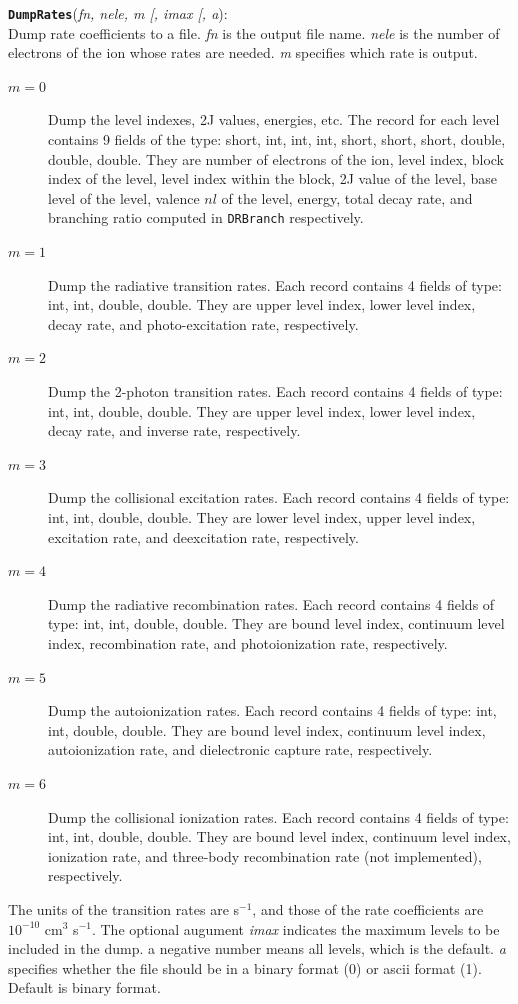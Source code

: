 \documentclass[twoside,letterpaper]{refrep}
\newcommand{\opt}[1]{
  {\textnormal{[}}{#1}\hspace{0.5mm}{\textnormal{]}}}
\newcommand{\var}[1]{\textit{#1}}
\newcommand{\key}[1]{\texttt{#1}}
\newenvironment{fundesc}[2]{
	\begin{center}
	\begin{minipage}{\textwidth}
	\index{#1}
	\addcontentsline{toc}{subsubsection}{#1}
	\key{\textbf{#1}}(\var{#2}):\\}
	{\end{minipage}\end{center}}
\begin{document}
\begin{fundesc}{DumpRates}{fn, nele, m\opt{, imax\opt{, a}}}
Dump rate coefficients to a file. \var{fn} is the output file name. \var{nele}
is the number of electrons of the ion whose rates are needed. \var{m}
specifies which rate is output.
\begin{description}
\item[$m=0$]
Dump the level indexes, 2J values, energies, etc. 
The record for each level contains 9 fields of the type: short, int, int,
int, short, short, short, double, double, double. They are number of electrons
of the ion, level index, block index of the level, level index within the
block, 2J value of the level, base level of the level, valence $nl$ of the
level, energy, total decay rate, and branching ratio computed in \key{DRBranch}
respectively. 
\item[$m=1$]
Dump the radiative transition rates. Each record contains 4 fields of type:
int, int, double, double. They are upper level index, lower level index, decay
rate, and photo-excitation rate, respectively.
\item[$m=2$]
Dump the 2-photon transition rates. Each record contains 4 fields of type:
int, int, double, double. They are upper level index, lower level index, decay
rate, and inverse rate, respectively.
\item[$m=3$]
Dump the collisional excitation rates. Each record contains 4 fields of type:
int, int, double, double. They are lower level index, upper level index, excitation
rate, and deexcitation rate, respectively.
\item[$m=4$]
Dump the radiative recombination rates. Each record contains 4 fields of type:
int, int, double, double. They are bound level index, continuum level index,
recombination rate, and photoionization rate, respectively.
\item[$m=5$]
Dump the autoionization rates. Each record contains 4 fields of type:
int, int, double, double. They are bound level index, continuum level index,
autoionization rate, and dielectronic capture rate, respectively.
\item[$m=6$]
Dump the collisional ionization rates. Each record contains 4 fields of type:
int, int, double, double. They are bound level index, continuum level index,
ionization rate, and three-body recombination rate (not implemented), respectively.
\end{description}
The units of the transition rates are s$^{-1}$, and those of the rate
coefficients are $10^{-10}$ cm$^{3}$ s$^{-1}$.
The optional augument \var{imax} indicates the maximum levels to be included
in the dump. a negative number means all levels, which is the default. \var{a}
specifies whether the file should be in a binary format (0) or ascii format
(1). Default is binary format.
\end{fundesc}
\end{document}
